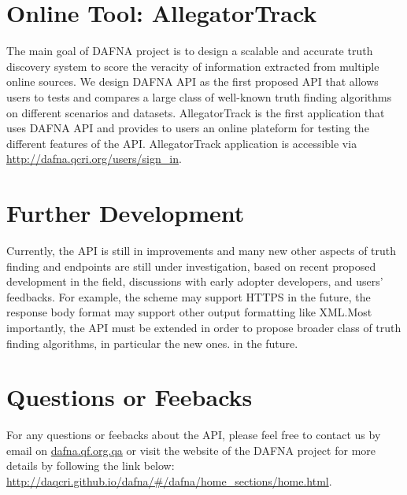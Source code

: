\documentclass[a4paper,10pt]{scrartcl}
\begin{document}
\section{Online Tool: AllegatorTrack}
The main goal of DAFNA project is to design a scalable and accurate truth discovery system to score the veracity of information extracted from multiple 
online sources.  We design DAFNA API as the first proposed API that allows users to tests and compares a large class of well-known truth finding algorithms
on different scenarios and datasets. AllegatorTrack is the first application that uses DAFNA API and provides to users
an online plateform for testing the different features of the API. AllegatorTrack application is accessible via \href{http://dafna.qcri.org/users/sign\_in}{http://dafna.qcri.org/users/sign\_in}.

\section{Further Development}
Currently, the API is still in improvements and many new other aspects of truth finding and endpoints are still under investigation, based on recent
proposed development in the field, discussions with early adopter developers, and users' feedbacks. For example, the scheme may support HTTPS in the 
future, the response body format may support other output formatting like XML.Most importantly, the API must be extended in order to propose broader 
class of truth finding algorithms, in particular the new ones.
in the future.

\section{Questions or Feebacks}
For any questions or feebacks about the API, please feel free to contact us by email on \href{mailto:lberti@qf.org.qa}{dafna.qf.org.qa}
or visit the website of the DAFNA project for more details by following the link below:
\href{http://daqcri.github.io/dafna/\#/dafna/home\_sections/home.html}{\small{http://daqcri.github.io/dafna/\#/dafna/home\_sections/home.html}}.
\end{document}

